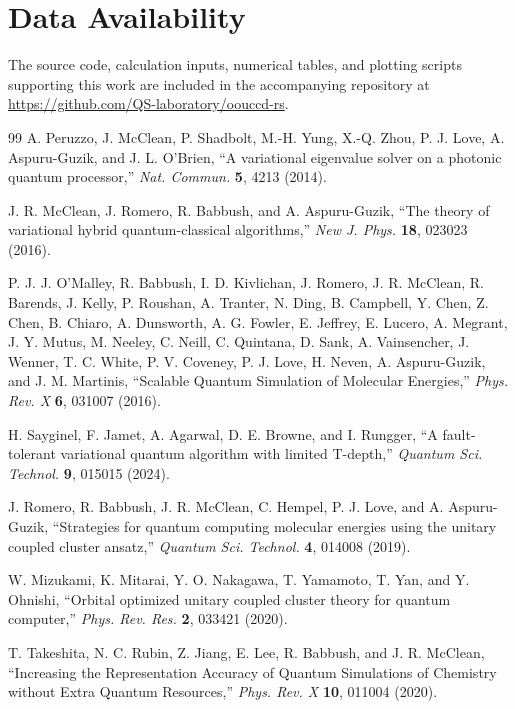 \documentclass[
 reprint,
 amsmath,amssymb,
 aps,
 physrev,
]{revtex4-2}
\begin{document}
\section*{Data Availability}
The source code, calculation inputs, numerical tables, and plotting scripts
supporting this work are included in the accompanying repository at
\url{https://github.com/QS-laboratory/oouccd-rs}.

%
\begin{thebibliography}{99}
    A. Peruzzo, J. McClean, P. Shadbolt, M.-H. Yung, X.-Q. Zhou, P. J. Love, A. Aspuru-Guzik, and J. L. O'Brien, ``A variational eigenvalue solver on a photonic quantum processor,'' \textit{Nat. Commun.} \textbf{5}, 4213 (2014).

    J. R. McClean, J. Romero, R. Babbush, and A. Aspuru-Guzik, ``The theory of variational hybrid quantum-classical algorithms,'' \textit{New J. Phys.} \textbf{18}, 023023 (2016).

    P. J. J. O'Malley, R. Babbush, I. D. Kivlichan, J. Romero, J. R. McClean, R. Barends, J. Kelly, P. Roushan, A. Tranter, N. Ding, B. Campbell, Y. Chen, Z. Chen, B. Chiaro, A. Dunsworth, A. G. Fowler, E. Jeffrey, E. Lucero, A. Megrant, J. Y. Mutus, M. Neeley, C. Neill, C. Quintana, D. Sank, A. Vainsencher, J. Wenner, T. C. White, P. V. Coveney, P. J. Love, H. Neven, A. Aspuru-Guzik, and J. M. Martinis, ``Scalable Quantum Simulation of Molecular Energies,'' \textit{Phys. Rev. X} \textbf{6}, 031007 (2016).

    H. Sayginel, F. Jamet, A. Agarwal, D. E. Browne, and I. Rungger, ``A fault-tolerant variational quantum algorithm with limited T-depth,'' \textit{Quantum Sci. Technol.} \textbf{9}, 015015 (2024).

    J. Romero, R. Babbush, J. R. McClean, C. Hempel, P. J. Love, and A. Aspuru-Guzik, ``Strategies for quantum computing molecular energies using the unitary coupled cluster ansatz,'' \textit{Quantum Sci. Technol.} \textbf{4}, 014008 (2019).

    W. Mizukami, K. Mitarai, Y. O. Nakagawa, T. Yamamoto, T. Yan, and Y. Ohnishi, ``Orbital optimized unitary coupled cluster theory for quantum computer,'' \textit{Phys. Rev. Res.} \textbf{2}, 033421 (2020).

    T. Takeshita, N. C. Rubin, Z. Jiang, E. Lee, R. Babbush, and J. R. McClean,
    ``Increasing the Representation Accuracy of Quantum Simulations of Chemistry without Extra Quantum Resources,''
    \textit{Phys. Rev. X} \textbf{10}, 011004 (2020).


\end{thebibliography}
\end{document}
